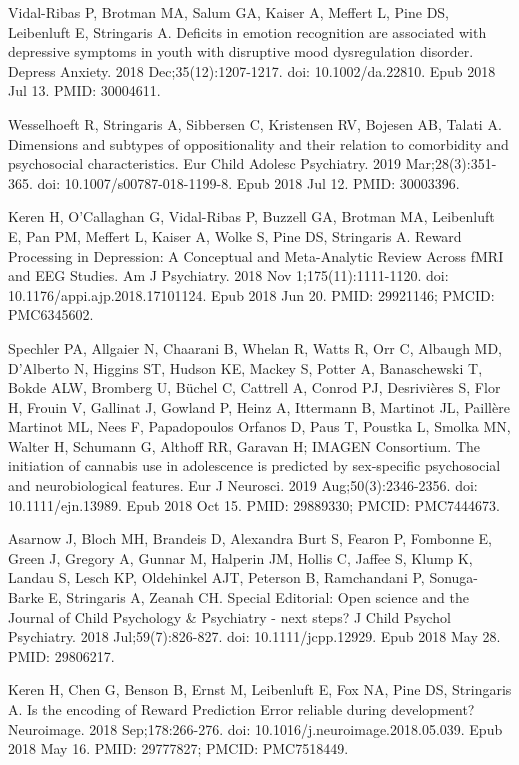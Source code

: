 \documentclass[
]{article}
\begin{document}
Vidal-Ribas P, Brotman MA, Salum GA, Kaiser A, Meffert L, Pine DS,
Leibenluft E, Stringaris A. Deficits in emotion recognition are
associated with depressive symptoms in youth with disruptive mood
dysregulation disorder. Depress Anxiety. 2018 Dec;35(12):1207-1217. doi:
10.1002/da.22810. Epub 2018 Jul 13. PMID: 30004611.

Wesselhoeft R, Stringaris A, Sibbersen C, Kristensen RV, Bojesen AB,
Talati A. Dimensions and subtypes of oppositionality and their relation
to comorbidity and psychosocial characteristics. Eur Child Adolesc
Psychiatry. 2019 Mar;28(3):351-365. doi: 10.1007/s00787-018-1199-8. Epub
2018 Jul 12. PMID: 30003396.

Keren H, O'Callaghan G, Vidal-Ribas P, Buzzell GA, Brotman MA,
Leibenluft E, Pan PM, Meffert L, Kaiser A, Wolke S, Pine DS, Stringaris
A. Reward Processing in Depression: A Conceptual and Meta-Analytic
Review Across fMRI and EEG Studies. Am J Psychiatry. 2018 Nov
1;175(11):1111-1120. doi: 10.1176/appi.ajp.2018.17101124. Epub 2018 Jun
20. PMID: 29921146; PMCID: PMC6345602.

Spechler PA, Allgaier N, Chaarani B, Whelan R, Watts R, Orr C, Albaugh
MD, D'Alberto N, Higgins ST, Hudson KE, Mackey S, Potter A, Banaschewski
T, Bokde ALW, Bromberg U, Büchel C, Cattrell A, Conrod PJ, Desrivières
S, Flor H, Frouin V, Gallinat J, Gowland P, Heinz A, Ittermann B,
Martinot JL, Paillère Martinot ML, Nees F, Papadopoulos Orfanos D, Paus
T, Poustka L, Smolka MN, Walter H, Schumann G, Althoff RR, Garavan H;
IMAGEN Consortium. The initiation of cannabis use in adolescence is
predicted by sex-specific psychosocial and neurobiological features. Eur
J Neurosci. 2019 Aug;50(3):2346-2356. doi: 10.1111/ejn.13989. Epub 2018
Oct 15. PMID: 29889330; PMCID: PMC7444673.

Asarnow J, Bloch MH, Brandeis D, Alexandra Burt S, Fearon P, Fombonne E,
Green J, Gregory A, Gunnar M, Halperin JM, Hollis C, Jaffee S, Klump K,
Landau S, Lesch KP, Oldehinkel AJT, Peterson B, Ramchandani P,
Sonuga-Barke E, Stringaris A, Zeanah CH. Special Editorial: Open science
and the Journal of Child Psychology \& Psychiatry - next steps? J Child
Psychol Psychiatry. 2018 Jul;59(7):826-827. doi: 10.1111/jcpp.12929.
Epub 2018 May 28. PMID: 29806217.

Keren H, Chen G, Benson B, Ernst M, Leibenluft E, Fox NA, Pine DS,
Stringaris A. Is the encoding of Reward Prediction Error reliable during
development? Neuroimage. 2018 Sep;178:266-276. doi:
10.1016/j.neuroimage.2018.05.039. Epub 2018 May 16. PMID: 29777827;
PMCID: PMC7518449.
\end{document}
